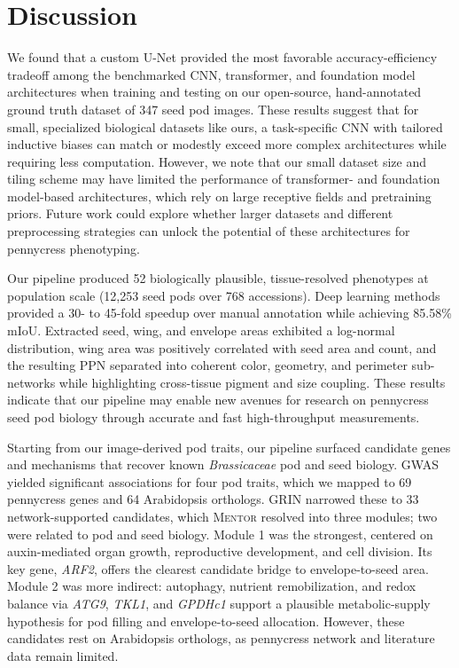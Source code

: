 \section{Discussion}
We found that a custom U-Net provided the most favorable accuracy-efficiency tradeoff among the benchmarked CNN, transformer, and foundation model architectures when training and testing on our open-source, hand-annotated ground truth dataset of 347 seed pod images. These results suggest that for small, specialized biological datasets like ours, a task-specific CNN with tailored inductive biases can match or modestly exceed more complex architectures while requiring less computation. However, we note that our small dataset size and tiling scheme may have limited the performance of transformer- and foundation model-based architectures, which rely on large receptive fields and pretraining priors. Future work could explore whether larger datasets and different preprocessing strategies can unlock the potential of these architectures for pennycress phenotyping.

Our pipeline produced 52 biologically plausible, tissue-resolved phenotypes at population scale (12,253 seed pods over 768 accessions). Deep learning methods provided a 30- to 45-fold speedup over manual annotation while achieving 85.58\% mIoU. Extracted seed, wing, and envelope areas exhibited a log-normal distribution, wing area was positively correlated with seed area and count, and the resulting PPN separated into coherent color, geometry, and perimeter sub-networks while highlighting cross-tissue pigment and size coupling. These results indicate that our pipeline may enable new avenues for research on pennycress seed pod biology through accurate and fast high-throughput measurements.

Starting from our image-derived pod traits, our pipeline surfaced candidate genes and mechanisms that recover known \textit{Brassicaceae} pod and seed biology. GWAS yielded significant associations for four pod traits, which we mapped to 69 pennycress genes and 64 Arabidopsis orthologs. GRIN narrowed these to 33 network-supported candidates, which \textsc{Mentor} resolved into three modules; two were related to pod and seed biology. Module 1 was the strongest, centered on auxin-mediated organ growth, reproductive development, and cell division. Its key gene, \textit{ARF2}, offers the clearest candidate bridge to envelope-to-seed area. Module 2 was more indirect: autophagy, nutrient remobilization, and redox balance via \textit{ATG9}, \textit{TKL1}, and \textit{GPDHc1} support a plausible metabolic-supply hypothesis for pod filling and envelope-to-seed allocation. However, these candidates rest on Arabidopsis orthologs, as pennycress network and literature data remain limited.

